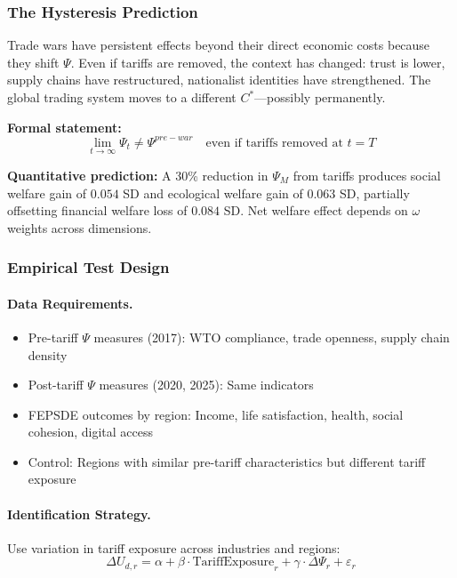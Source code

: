 \subsubsection{The Hysteresis Prediction}

\begin{tcolorbox}[colback=blue!5!white, colframe=blue!75!black, title=Prediction 1: Trade War Hysteresis]
Trade wars have persistent effects beyond their direct economic costs because 
they shift $\Psi$. Even if tariffs are removed, the context has changed: 
trust is lower, supply chains have restructured, nationalist identities 
have strengthened. The global trading system moves to a different $C^*$---possibly permanently.

\textbf{Formal statement:}
\begin{equation}
\lim_{t \to \infty} \Psi_t \neq \Psi^{pre-war} \quad \text{even if tariffs removed at } t = T
\end{equation}

\textbf{Quantitative prediction:} A 30\% reduction in $\Psi_M$ from tariffs 
produces social welfare gain of $0.054$ SD and ecological welfare gain of 
$0.063$ SD, partially offsetting financial welfare loss of $0.084$ SD.
Net welfare effect depends on $\omega$ weights across dimensions.
\end{tcolorbox}

\subsubsection{Empirical Test Design}

\paragraph{Data Requirements.}
\begin{itemize}
  \item Pre-tariff $\Psi$ measures (2017): WTO compliance, trade openness, supply chain density
  \item Post-tariff $\Psi$ measures (2020, 2025): Same indicators
  \item FEPSDE outcomes by region: Income, life satisfaction, health, social cohesion, digital access
  \item Control: Regions with similar pre-tariff characteristics but different tariff exposure
\end{itemize}

\paragraph{Identification Strategy.}
Use variation in tariff exposure across industries and regions:
\begin{equation}
\Delta U_{d,r} = \alpha + \beta \cdot \text{TariffExposure}_r + \gamma \cdot \Delta \Psi_{r} + \varepsilon_{r}
\end{equation}

